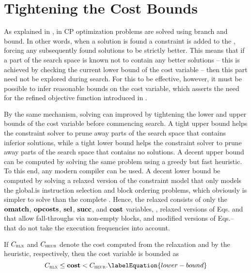 \section{Tightening the Cost Bounds}

As explained in , in \gls{CP} optimization
problems are solved using \gls{branch and bound}.
%
In other words, when a \gls{solution} is found a \gls{constraint} is added to
the , forcing any subsequently found \glspl{solution}
to be strictly better.
%
This means that if a part of the \gls{search space} is known not to contain any
better \glspl{solution} -- this is achieved by checking the current lower bound
of the \gls{cost variable} -- then this part need not be explored during
\gls{search}.
%
For this to be effective, however, it must be possible to infer reasonable
bounds on the \gls{cost variable}, which asserts the need for the refined
\gls{objective function} introduced in
.

By the same mechanism, solving can improved by tightening the lower and upper
bounds of the \gls{cost variable} before commencing \gls{search}.
%
A tight upper bound helps the \gls{constraint solver} to prune away parts of the
\gls{search space} that contains inferior \glspl{solution}, while a tight lower
bound helps the \gls{constraint solver} to prune away parts of the \gls{search
  space} that contains no \glspl{solution}.
%
A decent upper bound can be computed by solving the same problem using a greedy
but fast heuristic.
%
To this end, any modern \gls{compiler} can be used.
%
A decent lower bound be computed by solving a relaxed version of the
\gls{constraint model} that only models the \gls{global.is} \gls{instruction
  selection} and \gls{block ordering} problems, which obviously is simpler to
solve than the complete .
%
Hence, the relaxed  consists of only the
$\mVar{omatch}$, $\mVar{opcosts}$, $\mVar{sel}$, $\mVar{succ}$, and
$\mVar{cost}$ variables, , relaxed versions of
Eqs.\thinspace{} and  that
allow fall-throughs via non-empty \glspl{block}, and modified versions of
Eqs.\thinspace{}-- that do not
take the execution frequencies into account.

If $C_{\textsc{rlx}}$ and $C_{\textsc{heur}}$ denote the cost computed from the
relaxation and by the heuristic, respectively, then the \gls{cost variable} is
bounded as
%
\begin{equation}
  \mRelaxedCost \leq \mVar{cost} < \mHeuristicCost.
  \labelEquation{lower-bound}
\end{equation}


